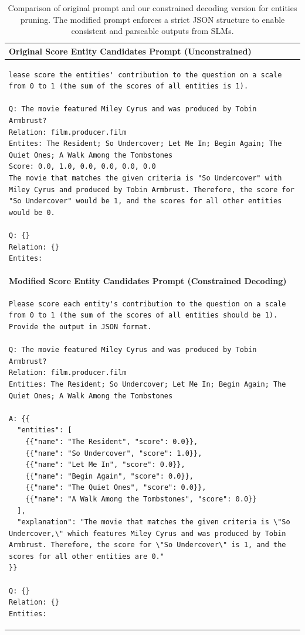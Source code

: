 \documentclass[11pt]{article}
\begin{document}
\begin{table}[t]
\centering
\begin{tabular}{|p{}|}
\hline
\textbf{\small Original Score Entity Candidates Prompt (Unconstrained)} \\
\hline
\begin{lstlisting}[basicstyle=\small\rmfamily,lineskip=0.1ex,aboveskip=0.2ex,belowskip=0.2ex,breaklines=true,columns=fullflexible ]
lease score the entities' contribution to the question on a scale from 0 to 1 (the sum of the scores of all entities is 1).

Q: The movie featured Miley Cyrus and was produced by Tobin Armbrust?
Relation: film.producer.film
Entites: The Resident; So Undercover; Let Me In; Begin Again; The Quiet Ones; A Walk Among the Tombstones
Score: 0.0, 1.0, 0.0, 0.0, 0.0, 0.0
The movie that matches the given criteria is "So Undercover" with Miley Cyrus and produced by Tobin Armbrust. Therefore, the score for "So Undercover" would be 1, and the scores for all other entities would be 0.

Q: {}
Relation: {}
Entites:
\end{lstlisting}\\
\hline
\textbf{\small Modified Score Entity Candidates Prompt (Constrained Decoding)} \\
\hline
\begin{lstlisting}[basicstyle=\small\rmfamily,lineskip=0.2ex,aboveskip=0ex,belowskip=0ex,breaklines=true,columns=fullflexible ]
Please score each entity's contribution to the question on a scale from 0 to 1 (the sum of the scores of all entities should be 1). Provide the output in JSON format.

Q: The movie featured Miley Cyrus and was produced by Tobin Armbrust?
Relation: film.producer.film
Entities: The Resident; So Undercover; Let Me In; Begin Again; The Quiet Ones; A Walk Among the Tombstones

A: {{
  "entities": [
    {{"name": "The Resident", "score": 0.0}},
    {{"name": "So Undercover", "score": 1.0}},
    {{"name": "Let Me In", "score": 0.0}},
    {{"name": "Begin Again", "score": 0.0}},
    {{"name": "The Quiet Ones", "score": 0.0}},
    {{"name": "A Walk Among the Tombstones", "score": 0.0}}
  ],
  "explanation": "The movie that matches the given criteria is \"So Undercover,\" which features Miley Cyrus and was produced by Tobin Armbrust. Therefore, the score for \"So Undercover\" is 1, and the scores for all other entities are 0."
}}

Q: {}
Relation: {}
Entities:

\end{lstlisting}
\\
\hline
\end{tabular}
\caption{Comparison of original prompt and our constrained decoding version for entities pruning. The modified prompt enforces a strict JSON structure to enable consistent and parseable outputs from SLMs.}
\label{tab:entity_prompt_comparison}
\end{table}
\end{document}
